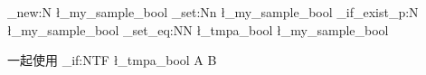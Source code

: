 \documentclass{article}
\begin{document}
\ExplSyntaxOn
\bool_new:N \l_my_sample_bool 
\bool_set:Nn \l_my_sample_bool 
  {
    \bool_if_exist_p:N \l_my_sample_bool 
  }
\bool_set_eq:NN \l_tmpa_bool \l_my_sample_bool

一起使用
\bool_if:NTF \l_tmpa_bool { A } { B }
\ExplSyntaxOff
\end{document}
